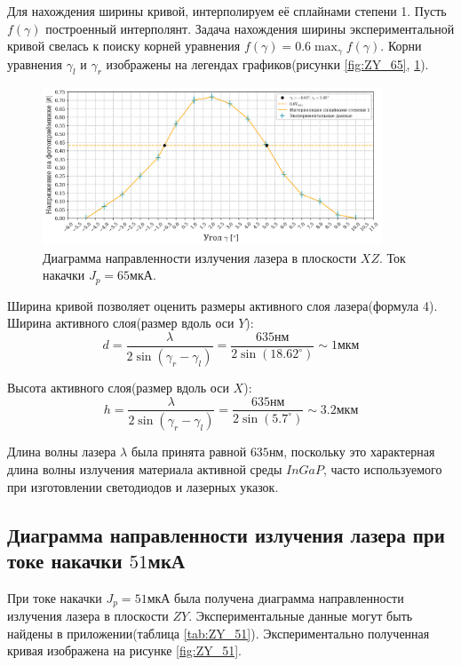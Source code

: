 \documentclass[a4paper, 12pt]{extarticle}
\begin{document}
Для нахождения ширины кривой, интерполируем её сплайнами степени 1. Пусть $f(\gamma)$ построенный интерполянт. Задача нахождения ширины экспериментальной кривой свелась к поиску корней уравнения $f(\gamma) = 0.6 \max_{\gamma} f(\gamma)$. Корни уравнения $\gamma_l$ и $\gamma_r$ изображены на легендах графиков(рисунки \ref{fig:ZY_65}, \ref{fig:XZ_65}).



\begin{figure}[htbp]
    \centering
    \includegraphics[width = 0.9\textwidth]{pics/vertical_65_muA.png}
    \caption{Диаграмма направленности излучения лазера в плоскости $XZ$. Ток накачки $J_p = 65\text{мкА}$.}
    \label{fig:XZ_65}
\end{figure}

Ширина кривой позволяет оценить размеры активного слоя лазера(формула 4). Ширина активного слоя(размер вдоль оси $Y$):
$$
d = \frac{\lambda}{2 \sin(\gamma_r - \gamma_l)} = \frac{635 \text{нм}}{2 \sin(18.62^{\circ})} \sim 1 \text{мкм}
$$

Высота активного слоя(размер вдоль оси $X$):
$$
h = \frac{\lambda}{2 \sin(\gamma_r - \gamma_l)} = \frac{635 \text{нм}}{2 \sin(5.7^{\circ})} \sim 3.2 \text{мкм}
$$

Длина волны лазера $\lambda$ была принята равной $635\text{нм}$, поскольку это характерная длина волны излучения материала активной среды $InGaP$, часто используемого при изготовлении светодиодов и лазерных указок.


\subsection*{\textcolor{sub_header}{Диаграмма направленности излучения лазера при токе накачки $51$мкА}}

При токе накачки $J_p = 51\text{мкА}$ была получена диаграмма направленности излучения лазера в плоскости $ZY$. Экспериментальные данные могут быть найдены в приложении(таблица \ref{tab:ZY_51}). Экспериментально полученная кривая изображена на рисунке  \ref{fig:ZY_51}.
\end{document}
